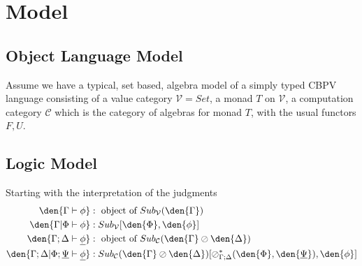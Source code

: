 \documentclass{article}
\begin{document}
\section{Model}
\subsection{Object Language Model}
Assume we have a typical, set based, algebra model of a simply typed CBPV language consisting of a value category 
$\mathcal{V}=Set$, a monad $T$ on $\mathcal{V}$, a computation category $\mathcal{C}$ which is the category of algebras for monad $T$, 
with the usual functors $F,U$.
\subsection{Logic Model}
Starting with the interpretation of the judgments
\begin{align*}
    \den{ \Gamma \vdash \phi } &: \textrm{ object of } Sub_{\mathcal{V}}(\den{ \Gamma })\\
    \den{  \Gamma | \Phi \vdash \phi } &: Sub_{\mathcal{V}}[\den{ \Phi } , \den{ \phi }]\\
    \den{ \Gamma ; \Delta \vdash \underline{\phi}} &: \textrm{ object of } Sub_{\mathcal{C}}(\den{ \Gamma } \oslash \den{ \Delta }) \\
    \den{ \Gamma ; \Delta | \Phi ; \underline{\Psi} \vdash \underline{\phi}} &:Sub_{\mathcal{C}}(\den{ \Gamma } \oslash \den{ \Delta })[\oslash^*_{\Gamma ; \Delta}(\den{ \Phi },\den{ \underline{\Psi} }), \den{ \phi }] \\
\end{align*}
\end{document}
